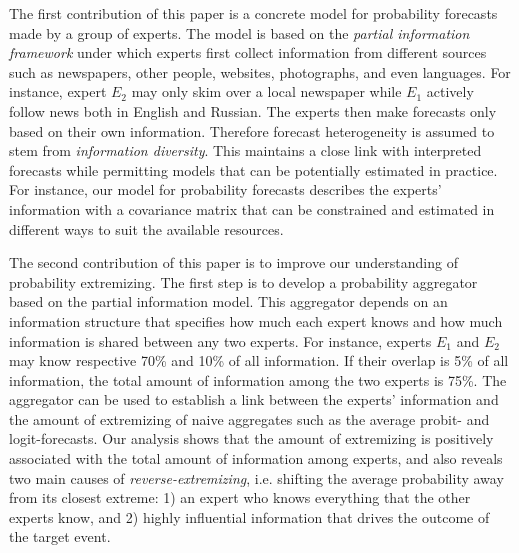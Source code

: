 \documentclass[11pt]{article}
\theoremstyle{definition}
\theoremstyle{definition}
\begin{document}
The first contribution of this paper is a concrete model for probability forecasts made by a group of experts. The model is based on the \textit{partial information framework} under which experts first collect information from different sources such as newspapers, other people, websites, photographs, and even languages. For instance, expert $E_2$ may only skim over a local newspaper while $E_1$ actively follow news both in English and Russian. The experts then make forecasts only based on their own information.
Therefore forecast heterogeneity is assumed to stem from \textit{information diversity}. This maintains a close link with interpreted forecasts while permitting models that can be potentially estimated in practice. For instance, our model for probability forecasts describes the experts' information with a covariance matrix that can be constrained and estimated in different ways to suit the available resources. 


The second contribution of this paper is to improve our understanding of probability extremizing. The first step is to develop a probability aggregator based on the partial information model. This aggregator depends on an information structure that specifies how much each expert knows and how much information is shared between any two experts. For instance, experts $E_1$ and $E_2$ may know respective 70\% and 10\% of all information. If their overlap is 5\% of all information, the total amount of information among the two experts is 75\%. The aggregator can be used to establish a link between the experts' information and the amount of extremizing of naive aggregates such as the average probit- and logit-forecasts. Our analysis shows that the amount of extremizing is positively associated with the total amount of information among experts, and also reveals two main causes of \textit{reverse-extremizing}, i.e. shifting the average probability away from its closest extreme: 1) an expert who knows everything that the other experts know, and 2) highly influential information that drives the outcome of the target event. 
\end{document}
